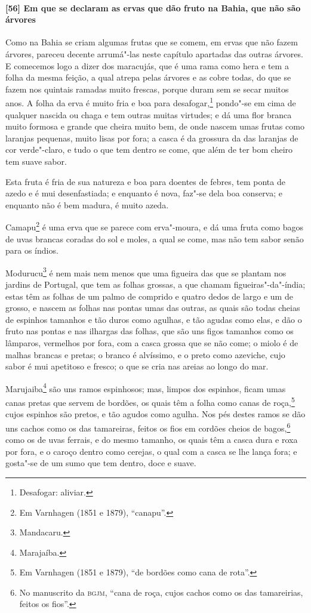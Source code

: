 \begin{linenumbers}
\paragraph{[56] Em que se declaram as ervas que dão fruto na Bahia, que não são árvores}\quad
Como na Bahia se criam algumas frutas que se comem, em ervas que não fazem árvores,
pareceu decente arrumá"-las neste capítulo apartadas das outras árvores. E comecemos logo a
dizer dos maracujás, que é uma rama como hera e tem a folha da mesma feição, a qual atrepa
pelas árvores e as cobre todas, do que se fazem nos quintais ramadas muito frescas, porque
duram sem se secar muitos anos. A folha da erva é muito fria e boa para
desafogar,\footnote{ Desafogar: aliviar.} pondo"-se em cima de qualquer nascida ou chaga e
tem outras muitas virtudes; e dá uma flor branca muito formosa e grande que cheira muito
bem, de onde nascem umas frutas como laranjas pequenas, muito lisas por fora; a casca é da
grossura da das laranjas de cor verde"-claro, e tudo o que tem dentro se come, que além de
ter bom cheiro tem suave sabor.

Esta fruta é fria de sua natureza e boa para doentes de febres, tem ponta de azedo e é mui
desenfastiada; e enquanto é nova, faz"-se dela boa conserva; e enquanto não é bem madura, é
muito azeda.

Camapu\footnote{ Em Varnhagen (1851 e 1879), ``canapu''.} é uma erva que se parece com
erva"-moura, e dá uma fruta como bagos de uvas brancas coradas do sol e moles, a qual se
come, mas não tem sabor senão para os índios.

Modurucu\footnote{ Mandacaru.} é nem mais nem menos que uma figueira das que se plantam
nos jardins de Portugal, que tem as folhas grossas, a que chamam figueiras"-da"-índia; estas
têm as folhas de um palmo de comprido e quatro dedos de largo e um de grosso, e nascem as
folhas nas pontas umas das outras, as quais são todas cheias de espinhos tamanhos e tão
duros como agulhas, e tão agudas como elas, e dão o fruto nas pontas e nas ilhargas das
folhas, que são uns figos tamanhos como os lâmparos, vermelhos por fora, com a casca
grossa que se não come; o miolo é de malhas brancas e pretas; o branco é alvíssimo, e o
preto como azeviche, cujo sabor é mui apetitoso e fresco; o que se cria nas areias ao
longo do mar.

Marujaiba\footnote{ Marajaíba.} são uns ramos espinhosos; mas, limpos dos espinhos, ficam
umas canas pretas que servem de bordões, os quais têm a folha como canas de
roça,\footnote{ Em Varnhagen (1851 e 1879), ``de bordões como cana de rota''.} cujos
espinhos são pretos, e tão agudos como agulha. Nos pés destes ramos se dão uns cachos como
os das tamareiras, feitos os fios em cordões cheios de bagos,\footnote{ No manuscrito da
\textsc{bgjm}, ``cana de roça, cujos cachos como os das tamareirias, feitos os fios''.}
como os de uvas ferrais, e do mesmo tamanho, 
os quais têm a casca dura e roxa por fora, e o caroço dentro como cerejas, o
qual com a casca se lhe lança fora; e gosta"-se de um sumo que tem dentro, doce e suave.


\end{linenumbers}
